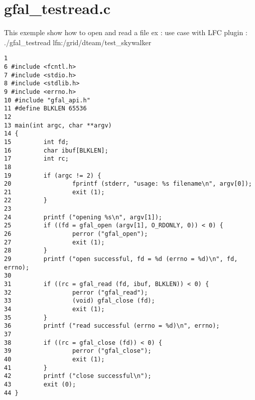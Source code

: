 \section{gfal\_\-testread.c}
This exemple show how to open and read a file ex : use case with LFC plugin : ./gfal\_\-testread lfn:/grid/dteam/test\_\-skywalker



\begin{DocInclude}\begin{verbatim}1 
6 #include <fcntl.h>
7 #include <stdio.h>
8 #include <stdlib.h>
9 #include <errno.h>
10 #include "gfal_api.h"
11 #define BLKLEN 65536
12 
13 main(int argc, char **argv)
14 {
15         int fd;
16         char ibuf[BLKLEN];
17         int rc;
18 
19         if (argc != 2) {
20                 fprintf (stderr, "usage: %s filename\n", argv[0]);
21                 exit (1);
22         }
23 
24         printf ("opening %s\n", argv[1]);
25         if ((fd = gfal_open (argv[1], O_RDONLY, 0)) < 0) {
26                 perror ("gfal_open");
27                 exit (1);
28         }
29         printf ("open successful, fd = %d (errno = %d)\n", fd, errno);
30 
31         if ((rc = gfal_read (fd, ibuf, BLKLEN)) < 0) {
32                 perror ("gfal_read");
33                 (void) gfal_close (fd);
34                 exit (1);
35         }
36         printf ("read successful (errno = %d)\n", errno);
37 
38         if ((rc = gfal_close (fd)) < 0) {
39                 perror ("gfal_close");
40                 exit (1);
41         }
42         printf ("close successful\n");
43         exit (0);
44 }
\end{verbatim}
\end{DocInclude}
 